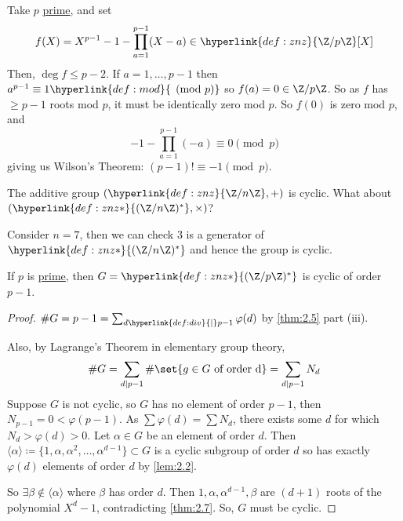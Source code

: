 \documentclass{article}
\begin{document}
\begin{eg}
    Take $p$ \hyperlink{def:prime}{prime}, and set
    \begin{equation*}f(X) = X^{p-1} - 1 - \prod_{a=1}^{p-1} (X - a) \in \hyperlink{def:znz}{\Z / p \Z} [X]\end{equation*}
    Then, $\deg f \leq p-2$. If $a=1, \dotsc, p-1$ then $a^{p-1} \equiv 1 \hyperlink{def:mod}{\pmod{p}}$ so $f(a) = 0 \in \Z/p\Z$.
    So as $f$ has $\geq p-1$ roots mod $p$, it must be identically zero mod $p$. So $f(0)$ is zero mod $p$, and
    \begin{equation*}
        -1 - \prod_{a=1}^{p-1} (-a) \equiv 0 \pmod{p}
    \end{equation*}
    giving us Wilson's Theorem: $(p-1)! \equiv -1 \pmod{p}$.
\end{eg}

The additive group $(\hyperlink{def:znz}{\Z / n\Z}, +)$ is cyclic. What about $(\hyperlink{def:znz*}{(\Z/n\Z)^*}, \times)$?

\begin{eg}
    Consider $n=7$, then we can check $3$ is a generator of $\hyperlink{def:znz*}{(\Z / n \Z)^*}$ and hence the group is cyclic.
\end{eg}

\begin{nthm}\label{thm:2.8}
    If $p$ is \hyperlink{def:prime}{prime}, then $G = \hyperlink{def:znz*}{(\Z / p \Z)^*}$ is cyclic of order $p-1$.
\end{nthm}

\begin{proof}
    $\# G = p-1 = \sum_{d \hyperlink{def:div}{\mid} p-1} \varphi(d)$ by \cref{thm:2.5} part (iii).

    Also, by Lagrange's Theorem in elementary group theory, \begin{equation*}\# G = \sum_{d \mid p-1} \# \set{g \in G \ \text{of order d}} = \sum_{d \mid p-1} N_d\end{equation*}
    Suppose $G$ is not cyclic, so $G$ has no element of order $p-1$, then ${N_{p-1} = 0 < \varphi(p-1)}$.
    As $\sum \varphi(d) = \sum N_d$, there exists some $d$ for which $N_d > \varphi(d) > 0$. Let $\alpha \in G$ be an element of order $d$.
    Then $\langle\alpha\rangle \coloneqq \{1, \alpha, \alpha^2, \dotsc, \alpha^{d-1}\} \subset G$ is a cyclic subgroup of order $d$ so has exactly $\varphi(d)$ elements of order $d$ by \cref{lem:2.2}.

    So $\exists \beta \notin \langle\alpha\rangle$ where $\beta$ has order $d$.
    Then $1, \alpha, \alpha^{d-1}, \beta$ are $(d+1)$ roots of the polynomial $X^d - 1$, contradicting \cref{thm:2.7}.
    So, $G$ must be cyclic.
\end{proof}
\end{document}
